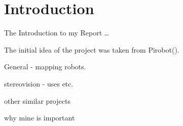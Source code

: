 \chapter{Introduction} \label{Chapter:Introduction}
The Introduction to my Report \dots

The initial idea of the project was taken from Pirobot(\cite{Pirobot}).

General - mapping robots. 

stereovision - uses etc.

other similar projects

why mine is important